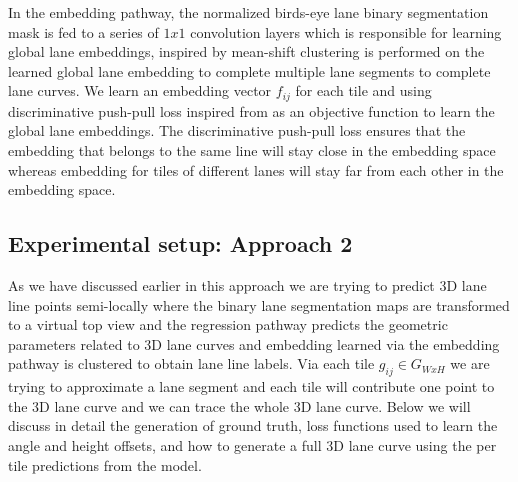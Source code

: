      In the embedding pathway, the normalized birds-eye lane binary segmentation mask is fed to a series of $1x1$ convolution layers which is responsible for learning global lane embeddings, inspired by \cite{DBLP:journals/corr/abs-1802-05591} mean-shift clustering is performed on the learned global lane embedding to complete multiple lane segments to complete lane curves. We learn an embedding vector $f_{ij}$ for each tile and using discriminative push-pull loss inspired from \cite{DBLP:journals/corr/abs-2011-01535} \cite{DBLP:journals/corr/abs-1802-05591} as an objective function to learn the global lane embeddings. The discriminative push-pull loss ensures that the embedding that belongs to the same line will stay close in the embedding space whereas embedding for tiles of different lanes will stay far from each other in the embedding space. 

    \subsection{Experimental setup: Approach 2}
    As we have discussed earlier in this approach we are trying to predict 3D lane line points semi-locally where the binary lane segmentation maps are transformed to a virtual top view and the regression pathway predicts the geometric parameters related to 3D lane curves and embedding learned via the embedding pathway is clustered to obtain lane line labels. Via each tile $g_{ij} \in G_{WxH}$ we are trying to approximate a lane segment and each tile will contribute one point to the 3D lane curve and we can trace the whole 3D lane curve. Below we will discuss in detail the generation of ground truth, loss functions used to learn the angle and height offsets, and how to generate a full 3D lane curve using the per tile predictions from the model. 
